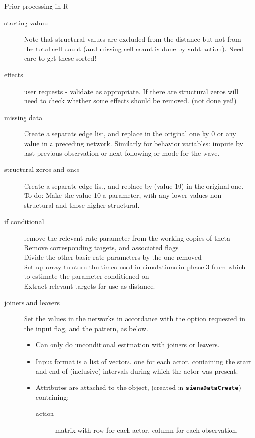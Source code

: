 \documentclass[12pt,a4paper]{article}
\makeatletter
\renewcommand{\=}{\,=\,}
\newcommand{\+}{\,+\,}
\newcommand{\sfn}[1]{\textbf{\texttt{#1}}}
\renewcommand{\section}{\@startsection{section}{1}
                {0pt}{\baselineskip}{0.5\baselineskip}
                {\centering\sffamily} }
\makeatother
\begin{document}
\section{Prior processing in R}
\begin{description}
\item[starting values] Note that structural values are excluded from the
  distance but not from the total cell count (and missing cell count is done by
  subtraction). Need care to get these sorted!
\item[effects] user requests - validate as appropriate. If there are
  structural zeros will need to check whether some effects should be
  removed. (not done yet!)
\item[missing data] Create a separate edge list, and replace in the original one
  by 0 or any value in a preceding network. Similarly for
    behavior variables: impute by last previous observation or next following or
    mode for the wave.
\item[structural zeros and ones] Create a separate edge list, and replace by
  (value-10) in the original one. To do: Make the value 10 a parameter,
    with any lower values non-structural and those higher structural.
\item[if conditional]
remove the relevant rate parameter from the working copies of
theta\\
Remove corresponding targets, and associated flags\\
Divide the other basic rate parameters by the one removed\\
Set up array to store the times used in simulations in phase 3 from
which to estimate the parameter conditioned on\\
Extract relevant targets for use as distance.
\item[joiners and leavers] Set the values in the networks in
  accordance with the option requested in the input flag, and the
  pattern, as below.
\begin{itemize}
\item Can only do unconditional estimation with joiners or leavers.
\item Input format is a list of vectors, one for each actor,
containing the start and end of (inclusive) intervals during which the actor was
present.
\item Attributes are attached to the object, (created in \sfn{sienaDataCreate})
  containing:
\begin{description}
\item[action] matrix with row for each actor, column for each observation.

\end{description}
\end{itemize}
\end{description}
\end{document}

